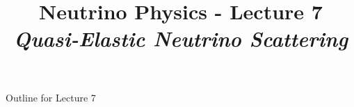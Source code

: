 \renewcommand{\thislecture}{7 }

%
%

\title[Neutrino Physics / Lecture \thislecture]
{
  {\huge \color{yellow} Neutrino Physics - Lecture \thislecture} \\
  {\it Quasi-Elastic Neutrino Scattering}\\
}



\begin{frame}[plain]
  \titlepage
\end{frame}

%
%

\begin{frame}{Outline for Lecture \thislecture}


\end{frame}


%
%

